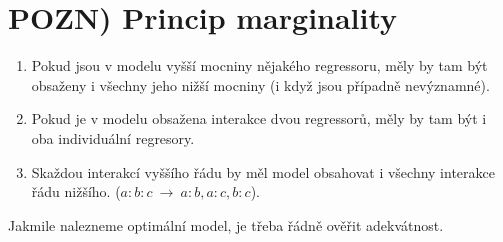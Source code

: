 \section*{POZN) Princip marginality}\begin{enumerate}[	1)]
	\item Pokud jsou v modelu vyšší mocniny nějakého regressoru, měly by tam být obsaženy i všechny jeho nižší mocniny (i když jsou případně nevýznamné).
	\item Pokud je v modelu obsažena interakce dvou regressorů, měly by tam být i oba individuální regresory.
	\item Skaždou interakcí vyššího řádu by měl model obsahovat i všechny interakce řádu nižšího. ($a:b:c~\to~a:b,a:c,b:c$).
\end{enumerate}
\begin{remark}
	Jakmile nalezneme optimální model, je třeba řádně ověřit adekvátnost.
\end{remark}